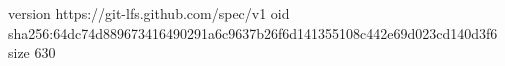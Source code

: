 version https://git-lfs.github.com/spec/v1
oid sha256:64dc74d889673416490291a6c9637b26f6d141355108c442e69d023cd140d3f6
size 630
